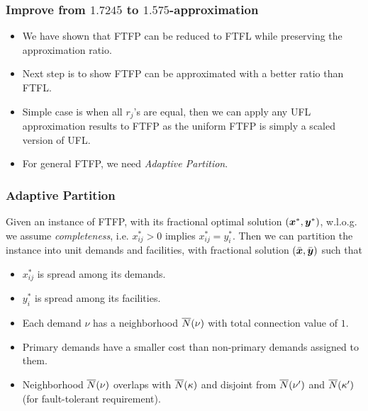 \documentclass[handout, hyperref, xcolor=dvipsnames]{beamer}
\begin{document}
\begin{frame}
  \frametitle{Improve from $1.7245$ to $1.575$-approximation}
  \begin{itemize}
  \item We have shown that FTFP can be reduced to FTFL while
    preserving the approximation ratio.
  \item Next step is to show FTFP can be approximated with a better
    ratio than FTFL.
  \item Simple case is when all $r_j$'s are equal, then we can apply
    any UFL approximation results to FTFP as the uniform FTFP is
    simply a scaled version of UFL.
  \item For general FTFP, we need \emph{Adaptive Partition}.
  \end{itemize}
\end{frame}

\begin{frame}
  \frametitle{Adaptive Partition} 

  Given an instance of FTFP, with its fractional optimal solution
  $(\boldsymbol{x}^\ast, \boldsymbol{y}^\ast)$, w.l.o.g. we assume \emph{completeness},
  i.e. $x_{ij}^\ast > 0$ implies $x_{ij} ^\ast = y_i^\ast$.  Then we
  can partition the instance into unit demands and facilities, with
  fractional solution $(\bar{\boldsymbol{x}}, \bar{\boldsymbol{y}})$ such that
  \begin{itemize}
  \item $x_{ij}^\ast$ is spread among its demands.
  \item $y_i^\ast$ is spread among its facilities.
  \item Each demand $\nu$ has a neighborhood ${\overline{N}}(\nu)$ with total
    connection value of $1$.
  \item Primary demands have a smaller cost than non-primary demands
    assigned to them.
  \item Neighborhood ${\overline{N}}(\nu)$ overlaps with ${\overline{N}}(\kappa)$ and
    disjoint from ${\overline{N}}(\nu')$ and ${\overline{N}}(\kappa')$ (for
    fault-tolerant requirement).
  \end{itemize}
\end{frame}
\end{document}
